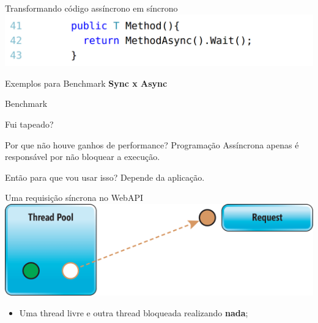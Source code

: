 \documentclass[10pt]{beamer}
\begin{document}
\begin{frame}{Transformando código assíncrono em síncrono}
	\includegraphics[scale=0.285]{imgs/03-asyncToSync.png}
\end{frame}

\begin{frame}{Exemplos para Benchmark}
	\textbf{Sync x Async}
\end{frame}


\begin{frame}{Benchmark}
	\begin{figure}
	\end{figure}
\end{frame}

\begin{frame}{Fui tapeado?}
	\begin{alertblock}{Por que não houve ganhos de performance?}
		Programação Assíncrona apenas é responsável por não bloquear a execução.
	\end{alertblock}
	\vspace{0.2cm}
	\begin{exampleblock}{Então para que vou usar isso?}
		Depende da aplicação.
	\end{exampleblock}
\end{frame}

\begin{frame}{Uma requisição síncrona no WebAPI}
	\includegraphics[width=\textwidth]{imgs/sync1}
	\begin{itemize}
		\item Uma thread livre e outra thread bloqueada realizando \textbf{nada};
	\end{itemize}
\end{frame}
\end{document}
